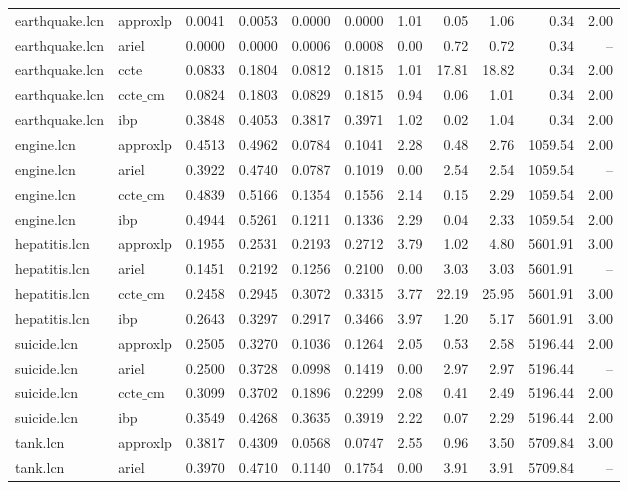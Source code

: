 \begin{table}[ht]
\begin{tabular}{llrrrrrrrrr}
earthquake.lcn & approxlp & 0.0041 & 0.0053 & 0.0000 & 0.0000 & 1.01 & 0.05 & 1.06 & 0.34 & 2.00 \\
earthquake.lcn & ariel & 0.0000 & 0.0000 & 0.0006 & 0.0008 & 0.00 & 0.72 & 0.72 & 0.34 & -- \\
earthquake.lcn & ccte & 0.0833 & 0.1804 & 0.0812 & 0.1815 & 1.01 & 17.81 & 18.82 & 0.34 & 2.00 \\
earthquake.lcn & $\text{ccte\_cm}$ & 0.0824 & 0.1803 & 0.0829 & 0.1815 & 0.94 & 0.06 & 1.01 & 0.34 & 2.00 \\
earthquake.lcn & ibp & 0.3848 & 0.4053 & 0.3817 & 0.3971 & 1.02 & 0.02 & 1.04 & 0.34 & 2.00 \\
engine.lcn & approxlp & 0.4513 & 0.4962 & 0.0784 & 0.1041 & 2.28 & 0.48 & 2.76 & 1059.54 & 2.00 \\
engine.lcn & ariel & 0.3922 & 0.4740 & 0.0787 & 0.1019 & 0.00 & 2.54 & 2.54 & 1059.54 & -- \\
engine.lcn & $\text{ccte\_cm}$ & 0.4839 & 0.5166 & 0.1354 & 0.1556 & 2.14 & 0.15 & 2.29 & 1059.54 & 2.00 \\
engine.lcn & ibp & 0.4944 & 0.5261 & 0.1211 & 0.1336 & 2.29 & 0.04 & 2.33 & 1059.54 & 2.00 \\
hepatitis.lcn & approxlp & 0.1955 & 0.2531 & 0.2193 & 0.2712 & 3.79 & 1.02 & 4.80 & 5601.91 & 3.00 \\
hepatitis.lcn & ariel & 0.1451 & 0.2192 & 0.1256 & 0.2100 & 0.00 & 3.03 & 3.03 & 5601.91 & -- \\
hepatitis.lcn & $\text{ccte\_cm}$ & 0.2458 & 0.2945 & 0.3072 & 0.3315 & 3.77 & 22.19 & 25.95 & 5601.91 & 3.00 \\
hepatitis.lcn & ibp & 0.2643 & 0.3297 & 0.2917 & 0.3466 & 3.97 & 1.20 & 5.17 & 5601.91 & 3.00 \\
suicide.lcn & approxlp & 0.2505 & 0.3270 & 0.1036 & 0.1264 & 2.05 & 0.53 & 2.58 & 5196.44 & 2.00 \\
suicide.lcn & ariel & 0.2500 & 0.3728 & 0.0998 & 0.1419 & 0.00 & 2.97 & 2.97 & 5196.44 & -- \\
suicide.lcn & $\text{ccte\_cm}$ & 0.3099 & 0.3702 & 0.1896 & 0.2299 & 2.08 & 0.41 & 2.49 & 5196.44 & 2.00 \\
suicide.lcn & ibp & 0.3549 & 0.4268 & 0.3635 & 0.3919 & 2.22 & 0.07 & 2.29 & 5196.44 & 2.00 \\
tank.lcn & approxlp & 0.3817 & 0.4309 & 0.0568 & 0.0747 & 2.55 & 0.96 & 3.50 & 5709.84 & 3.00 \\
tank.lcn & ariel & 0.3970 & 0.4710 & 0.1140 & 0.1754 & 0.00 & 3.91 & 3.91 & 5709.84 & -- \\

\end{tabular}
\end{table}
